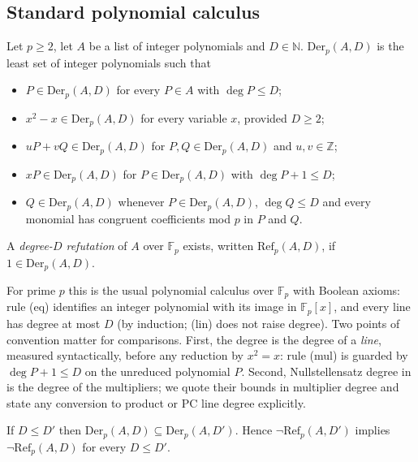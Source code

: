 \subsection{Standard polynomial calculus}\label{sec:defs-std}

\begin{definition}[standard PC]\label{def:stdpc}
Let $p\ge2$, let $A$ be a list of integer polynomials and $D\in\mathbb N$.
$\mathrm{Der}_p(A,D)$ is the least set of integer polynomials such that
\begin{itemize}
\item[(ax)] $P\in\mathrm{Der}_p(A,D)$ for every $P\in A$ with $\deg P\le D$;
\item[(bool)] $x^2-x\in\mathrm{Der}_p(A,D)$ for every variable $x$, provided $D\ge2$;
\item[(lin)] $uP+vQ\in\mathrm{Der}_p(A,D)$ for $P,Q\in\mathrm{Der}_p(A,D)$ and $u,v\in\mathbb Z$;
\item[(mul)] $xP\in\mathrm{Der}_p(A,D)$ for $P\in\mathrm{Der}_p(A,D)$ with $\deg P+1\le D$;
\item[(eq)] $Q\in\mathrm{Der}_p(A,D)$ whenever $P\in\mathrm{Der}_p(A,D)$, $\deg Q\le D$ and
  every monomial has congruent coefficients mod $p$ in $P$ and $Q$.
\end{itemize}
A \emph{degree-$D$ refutation} of $A$ over $\mathbb F_p$ exists, written
$\mathrm{Ref}_p(A,D)$, if $1\in\mathrm{Der}_p(A,D)$.
\end{definition}

For prime $p$ this is the usual polynomial calculus over $\mathbb F_p$ with Boolean
axioms: rule (eq) identifies an integer polynomial with its image in $\mathbb F_p[x]$, and
every line has degree at most $D$ (by induction; (lin) does not raise degree).  Two points
of convention matter for comparisons.  First, the degree is the degree of a \emph{line},
measured syntactically, before any reduction by $x^2=x$: rule (mul) is guarded by
$\deg P+1\le D$ on the unreduced polynomial $P$.  Second, Nullstellensatz degree in
\cite{beame1998counting} is the degree of the multipliers; we quote their bounds in
multiplier degree and state any conversion to product or PC line degree explicitly.

\begin{lemma}[monotonicity]\label{lem:mono}
If $D\le D'$ then $\mathrm{Der}_p(A,D)\subseteq\mathrm{Der}_p(A,D')$.  Hence
$\neg\mathrm{Ref}_p(A,D')$ implies $\neg\mathrm{Ref}_p(A,D)$ for every $D\le D'$.
\end{lemma}

